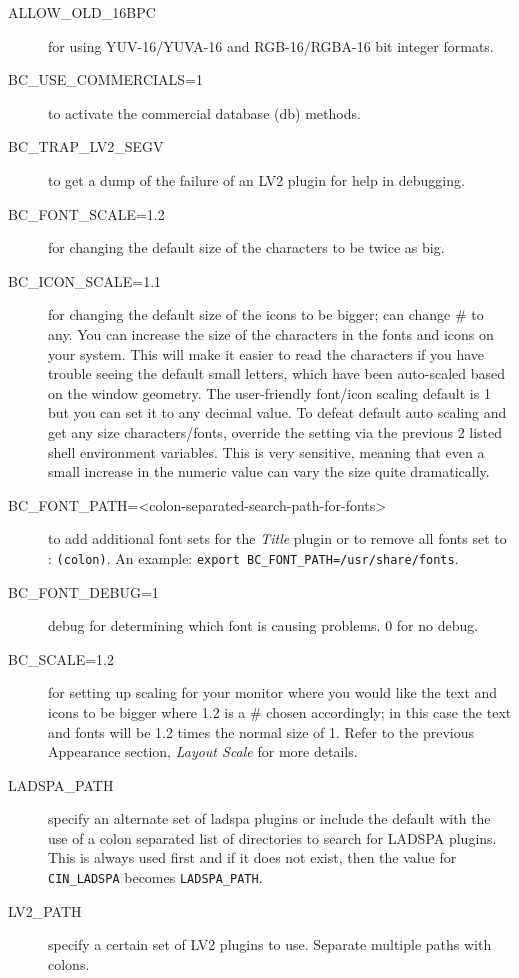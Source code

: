\begin{description}
    \item[{\small ALLOW\_OLD\_16BPC}] for using YUV-16/YUVA-16 and RGB-16/RGBA-16 bit integer formats.
    \item[{\small BC\_USE\_COMMERCIALS=1}] to activate the commercial database (db) methods.
    \item[{\small BC\_TRAP\_LV2\_SEGV}] to get a dump of the failure of an LV2 plugin for help in debugging.
    \item[{\small BC\_FONT\_SCALE=1.2}] for changing the default size of the characters to be twice as big.
    \item[{\small BC\_ICON\_SCALE=1.1}] for changing the default size of the icons to be bigger; can change \# to any. You can increase the size of the characters in the fonts and icons on your \CGG{} system.  This will make it easier to read the characters if you have trouble seeing the default small letters, which have been auto-scaled based on the window geometry. The user-friendly font/icon scaling default is 1 but you can set it to any decimal value.  To defeat default auto scaling and get any size characters/fonts, override the setting via the previous 2 listed shell environment variables. This is very sensitive, meaning that even a small increase in the numeric value can vary the size quite dramatically.
    \item[{\small BC\_FONT\_PATH=<colon-separated-search-path-for-fonts>}]  to add additional font sets for the \textit{Title}
    plugin or to remove all fonts set to : \texttt{(colon)}.  An example: \texttt{export BC\_FONT\_PATH=/usr/share/fonts}.
    \item[{\small BC\_FONT\_DEBUG=1}] debug for determining which font is causing problems.  0 for no debug.
    \item[{\small BC\_SCALE=1.2}] for setting up scaling for your monitor where you would like the text and icons to be bigger where 1.2 is a \# chosen accordingly; in this case the text and fonts will be 1.2 times the
normal size of 1. Refer to the previous Appearance section, \textit{Layout Scale} for more details.
    \item[{\small LADSPA\_PATH}] specify an alternate set of ladspa plugins or include the default with the use of a colon separated list of directories to search for LADSPA plugins. This is always used first and if it does not
    exist, then the value for \texttt{CIN\_LADSPA} becomes \texttt{LADSPA\_PATH}.
    \item[{\small LV2\_PATH}] specify a certain set of LV2 plugins to use.  Separate multiple paths with colons.

\end{description}
